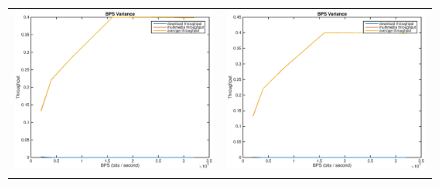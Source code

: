\begin{figure}
\begin{tabular}{cc}
\includegraphics[scale=0.35]{../../src/fig-simulation_download_multimedia-bps-1_1_10_10_12000.eps} & \includegraphics[scale=0.35]{../../src/fig-simulation_download_multimedia-bps-1_1_10_25_12000.eps} \\ 


\end{tabular}
\end{figure}
